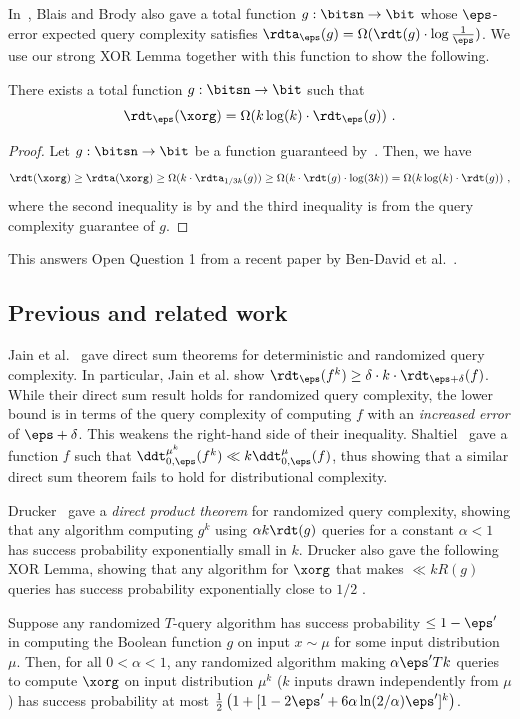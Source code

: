 \documentclass{toc}
\begin{document}
In~\cite{BlaisB19}, Blais and Brody also gave a total function
$g:\bitsn\rightarrow \bit$ whose $\eps$-error
%
expected  %
query complexity
satisfies $\rdta_\eps(g) = \Omega(\rdt(g)\cdot \log \frac{1}{\eps})$.
We use our strong XOR Lemma together with this function to show the following.

\begin{corollary}\label{cor:application}
  There exists a total function $g:\bitsn \rightarrow \bit$ such that
  $$\rdt_\eps(\xorg) = \Omega(k\log(k)\cdot \rdt_\eps(g))\ .$$
\end{corollary}
\begin{proof}
  Let $g: \bitsn \rightarrow \bit$ be a function guaranteed
  by~\cite{BlaisB19}.  Then, we have
  $$\rdt(\xorg) \geq \rdta(\xorg) \geq \Omega(k\cdot \rdta_{1/3k}(g)) \geq
  \Omega(k\cdot \rdt(g)\cdot \log(3k)) = \Omega(k\log(k)\cdot \rdt(g))\ ,$$
  where the second inequality is by  and the
  third inequality is from the query complexity guarantee of $g$.
\end{proof}


This answers Open Question 1 from %
a recent paper by  %
Ben-David et al.~\cite{BenDavidGKW20}.

%
\subsection{Previous and related work}

Jain et al.~\cite{JainKS10} gave direct sum theorems for deterministic
and randomized query complexity.  %
%
%
%
%
In particular, Jain et al. show
$\rdt_\eps(f^k) \geq \delta \cdot k \cdot \rdt_{\eps + \delta}(f)$.
While their direct sum result holds for randomized query complexity,
the lower bound is in terms of the query complexity of computing $f$
with an \emph{increased error} of $\eps+\delta$.  This weakens the right-hand side of their inequality.
%
%
%
%
%
%
Shaltiel~\cite{Shaltiel03} gave a function $f$ such %
that $\ddt_{0,\eps}^{\mu^k}(f^k) \ll k\ddt_{0,\eps}^\mu(f)$, thus %
showing that a similar direct sum theorem fails to hold for %
distributional complexity. %

%
%
%
%
%
%
%
%
Drucker~\cite{Drucker12} gave a
\emph{direct product theorem} for randomized query complexity, showing
that any algorithm computing $g^k$ using $\alpha k\rdt(g)$ queries for
a constant $\alpha<1$ has success probability exponentially small in
$k$.  %
Drucker also gave the following XOR Lemma, showing that any
algorithm for $\xorg$ that makes $\ll kR(g)$ queries has
success probability exponentially close to $1/2$
%
%
%
\cite[Theorem 1.3]{Drucker12}.
%
\begin{theorem}[Drucker]
Suppose any
%
randomized %
$T$-query algorithm has success
probability  %
$\leq 1-\eps'$ in computing
%
the Boolean function %
$g$ on input $x \sim \mu$
for some input distribution $\mu$.
%
Then, for all $0<\alpha<1$, any randomized  
algorithm making $\alpha \eps' Tk$ queries to compute $\xorg$
on input distribution $\mu^k$   %
($k$ inputs drawn independently from $\mu$)  %
has success probability at most
  $\frac{1}{2}\left(1 + [1-2\eps' +
    6\alpha\ln(2/\alpha)\eps']^k\right)$.
\end{theorem}
\end{document}
